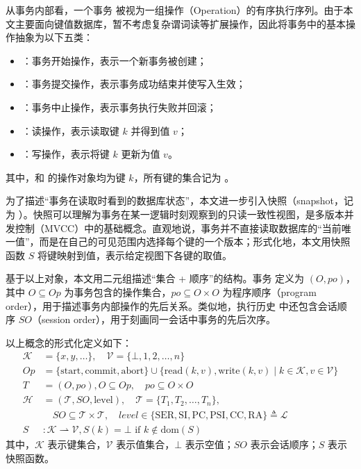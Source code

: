 从事务内部看，一个事务 \Txc 被视为一组操作（Operation）的有序执行序列。由于本文主要面向键值数据库，暂不考虑复杂谓词读等扩展操作，因此将事务中的基本操作抽象为以下五类：
\begin{itemize}
    \item \OpStart：事务开始操作，表示一个新事务被创建；
    \item \OpCommit：事务提交操作，表示事务成功结束并使写入生效；
    \item \OpAbort：事务中止操作，表示事务执行失败并回滚；
    \item \OpRead[k][v]：读操作，表示读取键 $k$ 并得到值 $v$；
    \item \OpWrite[k][v]：写操作，表示将键 $k$ 更新为值 $v$。
\end{itemize}
其中，\OpRead 和 \OpWrite 的操作对象均为键 $k$，所有键的集合记为 \Keys。

为了描述“事务在读取时看到的数据库状态”，本文进一步引入快照（snapshot，记为 \Snapshot）。快照可以理解为事务在某一逻辑时刻观察到的只读一致性视图，是多版本并发控制（MVCC）中的基础概念。直观地说，事务并不直接读取数据库的“当前唯一值”，而是在自己的可见范围内选择每个键的一个版本；形式化地，本文用快照函数 $S$ 将键映射到值，表示给定视图下各键的取值。

基于以上对象，本文用二元组描述“集合 + 顺序”的结构。事务 \Txc 定义为 $(O, po)$，其中 $O \subseteq Op$ 为事务包含的操作集合，$po \subseteq O \times O$ 为程序顺序（program order），用于描述事务内部操作的先后关系。类似地，执行历史 \History 中还包含会话顺序 $SO$（session order），用于刻画同一会话中事务的先后次序。

以上概念的形式化定义如下：
\begin{equation}
    \begin{aligned}
        \mathcal{K} & = \{ x, y, \ldots\}, \quad \mathcal{V} = \{ \bot ,1, 2, \ldots, n \}                                                                                               \\
        Op          & = \{ \text{start}, \text{commit}, \text{abort} \} \cup \{ \text{read}(k, v), \text{write}(k, v) \mid k \in \mathcal{K}, v \in \mathcal{V} \}                       \\
        T           & = (O, po), O \subseteq Op, \quad  po \subseteq O \times O                                                                                                          \\
        \mathcal{H} & = (\mathcal{T}, SO, \text{level}), \quad \mathcal{T} = \{T_1, T_2, \ldots, T_n\},                                                                                  \\
                    & \quad SO \subseteq \mathcal{T} \times \mathcal{T}, \quad level \in \{\text{SER}, \text{SI}, \text{PC}, \text{PSI}, \text{CC}, \text{RA}\}  \triangleq  \mathcal{L} \\
        S           & : \mathcal{K} \rightharpoonup \mathcal{V},  S(k) = \bot \text{ if } k \notin \text{dom}(S)
    \end{aligned}
\end{equation}
其中，$\mathcal{K}$ 表示键集合，$\mathcal{V}$ 表示值集合，$\bot$ 表示空值；$SO$ 表示会话顺序；$S$ 表示快照函数。


